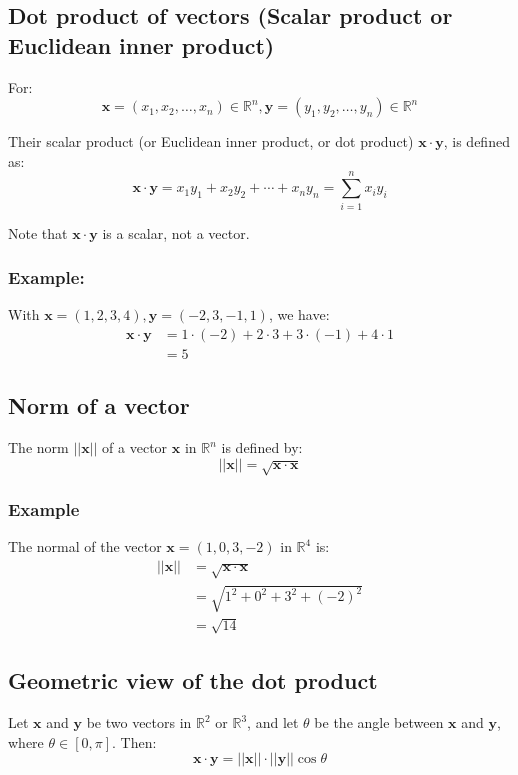 \documentclass[11pt]{article}
\begin{document}
\newpage

\subsection{Dot product of vectors (Scalar product or Euclidean inner product)}
\label{sec:orgc1296ae}
For:
\[\boldsymbol{x} = (x_1, x_2, \ldots, x_n) \in \mathbb{R}^n, \boldsymbol{y} = (y_1, y_2, \ldots, y_n) \in \mathbb{R}^n\]

Their scalar product (or Euclidean inner product, or dot product) \(\boldsymbol{x} \cdot \boldsymbol{y}\), is defined as:
\[\boldsymbol{x} \cdot \boldsymbol{y} = x_1 y_1 + x_2 y_2 + \cdots + x_n y_n = \sum_{i = 1}^n x_i y_i\]

Note that \(\boldsymbol{x} \cdot \boldsymbol{y}\) is a scalar, not a vector.

\subsubsection{Example:}
\label{sec:org57e60b3}
With \(\boldsymbol{x} = (1, 2, 3, 4), \boldsymbol{y} = (-2, 3, -1, 1)\), we have:
\begin{align*}
\boldsymbol{x} \cdot \boldsymbol{y} &= 1 \cdot (-2) + 2 \cdot 3 + 3 \cdot (-1) + 4 \cdot 1 \\
&= 5
\end{align*}

\subsection{Norm of a vector}
\label{sec:orge3234d6}
The norm \(||\boldsymbol{x}||\) of a vector \(\boldsymbol{x}\) in \(\mathbb{R}^n\) is defined by:
\[||\boldsymbol{x}|| = \sqrt{\boldsymbol{x} \cdot \boldsymbol{x}}\]

\subsubsection{Example}
\label{sec:orgbff1141}
The normal of the vector \(\boldsymbol{x} = (1, 0, 3, -2)\) in \(\mathbb{R}^4\) is:
\begin{align*}
||\boldsymbol{x}|| &= \sqrt{\boldsymbol{x} \cdot \boldsymbol{x}} \\
&= \sqrt{1^2 + 0^2 + 3^2 + (-2)^2} \\
&= \sqrt{14}
\end{align*}

\subsection{Geometric view of the dot product}
\label{sec:orgeb07801}
Let \(\boldsymbol{x}\) and \(\boldsymbol{y}\) be two vectors in \(\mathbb{R}^2\) or \(\mathbb{R}^3\), and let \(\theta\) be the angle between \(\boldsymbol{x}\) and \(\boldsymbol{y}\), where \(\theta \in [0, \pi]\). Then:
\[\boldsymbol{x} \cdot \boldsymbol{y} = || \boldsymbol{x} || \cdot || \boldsymbol{y} || \cos \theta\]
\end{document}
